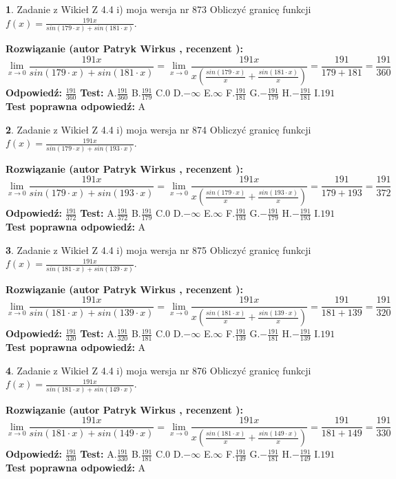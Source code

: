 \documentclass[12pt, a4paper]{article}
\theoremstyle{definition} %
\newtheorem{zad}{}
\newcommand{\zadStart}[1]{\begin{zad}#1\newline}
\newcommand{\zadStop}{\end{zad}}
\newcommand{\rozwStart}[2]{\noindent \textbf{Rozwiązanie (autor #1 , recenzent #2): }\newline}
\newcommand{\rozwStop}{\newline}
\newcommand{\odpStart}{\noindent \textbf{Odpowiedź:}\newline}
\newcommand{\odpStop}{\newline}
\newcommand{\testStart}{\noindent \textbf{Test:}\newline}
\newcommand{\testStop}{\newline}
\newcommand{\kluczStart}{\noindent \textbf{Test poprawna odpowiedź:}\newline}
\newcommand{\kluczStop}{\newline}
\begin{document}
\zadStart{Zadanie z Wikieł Z 4.4 i) moja wersja nr 873}
Obliczyć granicę funkcji $f(x)=\frac{191x}{sin(179\cdot x) +sin(181\cdot x)}$.
\zadStop
\rozwStart{Patryk Wirkus}{}
$$\lim\limits_{x\to 0}\frac{191x}{sin(179\cdot x) +sin(181\cdot x)}=\lim\limits_{x\to 0}\frac{191x}{x(\frac{sin(179\cdot x)}{x}+\frac{sin(181\cdot x)}{x})}=\frac{191}{179+181} = \frac{191}{360}$$
\rozwStop
\odpStart
$\frac{191}{360}$
\odpStop
\testStart
A.$\frac{191}{360}$
B.$\frac{191}{179}$
C.$0$
D.$-\infty$
E.$\infty$
F.$\frac{191}{181}$
G.$-\frac{191}{179}$
H.$-\frac{191}{181}$
I.$191$
\testStop
\kluczStart
A
\kluczStop



\zadStart{Zadanie z Wikieł Z 4.4 i) moja wersja nr 874}
Obliczyć granicę funkcji $f(x)=\frac{191x}{sin(179\cdot x) +sin(193\cdot x)}$.
\zadStop
\rozwStart{Patryk Wirkus}{}
$$\lim\limits_{x\to 0}\frac{191x}{sin(179\cdot x) +sin(193\cdot x)}=\lim\limits_{x\to 0}\frac{191x}{x(\frac{sin(179\cdot x)}{x}+\frac{sin(193\cdot x)}{x})}=\frac{191}{179+193} = \frac{191}{372}$$
\rozwStop
\odpStart
$\frac{191}{372}$
\odpStop
\testStart
A.$\frac{191}{372}$
B.$\frac{191}{179}$
C.$0$
D.$-\infty$
E.$\infty$
F.$\frac{191}{193}$
G.$-\frac{191}{179}$
H.$-\frac{191}{193}$
I.$191$
\testStop
\kluczStart
A
\kluczStop



\zadStart{Zadanie z Wikieł Z 4.4 i) moja wersja nr 875}
Obliczyć granicę funkcji $f(x)=\frac{191x}{sin(181\cdot x) +sin(139\cdot x)}$.
\zadStop
\rozwStart{Patryk Wirkus}{}
$$\lim\limits_{x\to 0}\frac{191x}{sin(181\cdot x) +sin(139\cdot x)}=\lim\limits_{x\to 0}\frac{191x}{x(\frac{sin(181\cdot x)}{x}+\frac{sin(139\cdot x)}{x})}=\frac{191}{181+139} = \frac{191}{320}$$
\rozwStop
\odpStart
$\frac{191}{320}$
\odpStop
\testStart
A.$\frac{191}{320}$
B.$\frac{191}{181}$
C.$0$
D.$-\infty$
E.$\infty$
F.$\frac{191}{139}$
G.$-\frac{191}{181}$
H.$-\frac{191}{139}$
I.$191$
\testStop
\kluczStart
A
\kluczStop



\zadStart{Zadanie z Wikieł Z 4.4 i) moja wersja nr 876}
Obliczyć granicę funkcji $f(x)=\frac{191x}{sin(181\cdot x) +sin(149\cdot x)}$.
\zadStop
\rozwStart{Patryk Wirkus}{}
$$\lim\limits_{x\to 0}\frac{191x}{sin(181\cdot x) +sin(149\cdot x)}=\lim\limits_{x\to 0}\frac{191x}{x(\frac{sin(181\cdot x)}{x}+\frac{sin(149\cdot x)}{x})}=\frac{191}{181+149} = \frac{191}{330}$$
\rozwStop
\odpStart
$\frac{191}{330}$
\odpStop
\testStart
A.$\frac{191}{330}$
B.$\frac{191}{181}$
C.$0$
D.$-\infty$
E.$\infty$
F.$\frac{191}{149}$
G.$-\frac{191}{181}$
H.$-\frac{191}{149}$
I.$191$
\testStop
\kluczStart
A
\kluczStop
\end{document}
